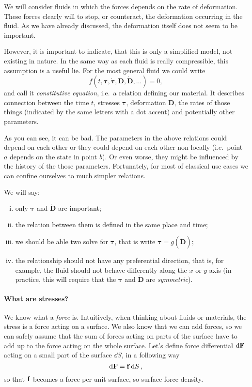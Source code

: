 \documentclass{article}
\begin{document}
We will consider fluids in which the forces depends on the rate of deformation. 
These forces clearly will  to stop, or counteract, the deformation 
occurring in the fluid. As we have already discussed, the deformation itself 
does not seem to be important.

However, it is important to indicate, that this is only a simplified model, 
not existing in nature. In the same way as each fluid is really compressible,
this assumption is a useful lie. For  
the most general fluid we could write
\[
  f(t, \bm{\tau}, \dot{\bm{\tau}}, \bm{D}, \dot{\bm{D}}, \dots) = 0,
\]
and call it \emph{constitutive equation}, i.e.\ a relation defining our material.
It describes connection between the time \(t\), stresses \(\bm{\tau}\), deformation \(\bm{D}\),
the rates of those things (indicated by the same letters with a dot accent) 
and potentially other parameters.

As you can see, it can be bad. The parameters in the above relations could
depend on each other or they could depend on each other non-locally (i.e.\ point
\(a\) depends on the state in point \(b\)). Or even worse, they might be influenced
by the history of the those parameters. Fortunately, for most of classical use 
cases we can confine ourselves to much simpler relations.

We will say:
\begin{enumerate}[(i)]
  \item only \(\bm{\tau}\) and \(\dot{\bm{D}}\) are important;
  \item the relation between them is defined in the same place and time;
  \item we should be able two solve for \(\bm{\tau}\), that is write
    \(
      \bm{\tau} = g(\dot{\bm{D}});
    \)
  \item the relationship should not have any preferential direction, that 
    is, for example, the fluid should not behave differently along the \(x\) 
    or \(y\) axis (in practice, this will require that the \(\bm{\tau}\) and
    \(\dot{\bm{D}}\) are \emph{symmetric}). 
\end{enumerate}

\paragraph{What are stresses?}
We know what a \emph{force} is. Intuitively,
when thinking about fluids or materials, the stress is a force acting on 
a surface. We also know that we can add forces, so we can safely assume that
the sum of forces acting on parts of the surface have to add up to the force 
acting on the whole surface. Let's define force differential \(\dd{\vb{F}}\) acting 
on a small part of the surface \(\dd S\), in a following way
\[
  \dd \vb{F} = \vb{f}\dd{S},
\]
so that \(\vb{f}\) becomes a force per unit surface, so surface force density.
\end{document}
